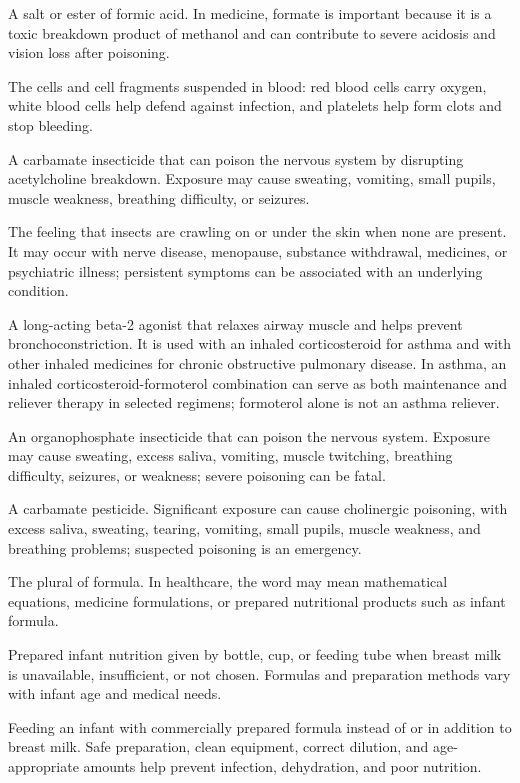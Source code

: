  A salt or ester of formic acid. In medicine, formate is important because it is a toxic breakdown product of methanol and can contribute to severe acidosis and vision loss after poisoning.

 The cells and cell fragments suspended in blood: red blood cells carry oxygen, white blood cells help defend against infection, and platelets help form clots and stop bleeding.

 A carbamate insecticide that can poison the nervous system by disrupting acetylcholine breakdown. Exposure may cause sweating, vomiting, small pupils, muscle weakness, breathing difficulty, or seizures.

 The feeling that insects are crawling on or under the skin when none are present. It may occur with nerve disease, menopause, substance withdrawal, medicines, or psychiatric illness; persistent symptoms can be associated with an underlying condition.

 A long-acting beta-2 agonist that relaxes airway muscle and helps prevent bronchoconstriction. It is used with an inhaled corticosteroid for asthma and with other inhaled medicines for chronic obstructive pulmonary disease. In asthma, an inhaled corticosteroid-formoterol combination can serve as both maintenance and reliever therapy in selected regimens; formoterol alone is not an asthma reliever.

 An organophosphate insecticide that can poison the nervous system. Exposure may cause sweating, excess saliva, vomiting, muscle twitching, breathing difficulty, seizures, or weakness; severe poisoning can be fatal.

 A carbamate pesticide. Significant exposure can cause cholinergic poisoning, with excess saliva, sweating, tearing, vomiting, small pupils, muscle weakness, and breathing problems; suspected poisoning is an emergency.

 The plural of formula. In healthcare, the word may mean mathematical equations, medicine formulations, or prepared nutritional products such as infant formula.

 Prepared infant nutrition given by bottle, cup, or feeding tube when breast milk is unavailable, insufficient, or not chosen. Formulas and preparation methods vary with infant age and medical needs.

 Feeding an infant with commercially prepared formula instead of or in addition to breast milk. Safe preparation, clean equipment, correct dilution, and age-appropriate amounts help prevent infection, dehydration, and poor nutrition.

